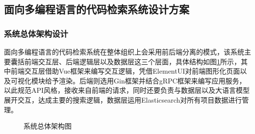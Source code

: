 \documentclass[UTF8,a4paper,12pt]{ctexart}
\numberwithin{equation}{section}
\begin{document}
\subsection{面向多编程语言的代码检索系统设计方案}
\subsubsection{系统总体架构设计}
面向多编程语言的代码检索系统在整体组织上会采用前后端分离的模式，该系统主要囊括前端交互层、后端逻辑层以及数据层这三个层面，具体结构如图\ref{all_structure}所示，其中前端交互层借助Vue框架来编写交互逻辑，凭借ElementUI对前端图形化页面以及可视化模块给予渲染。后端则选用Gin框架并结合gRPC框架来编写应用服务，以此规范API风格，接收来自前端的请求，同时还要负责与数据层以及大语言模型展开交互，达成主要的搜索逻辑，数据层运用Elasticsearch对所有项目数据进行管理。\par
\begin{figure}[H]
	\caption{系统总体架构图}
	\label{all_structure}
\end{figure}
\end{document}
